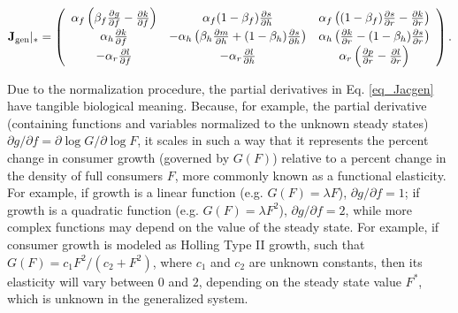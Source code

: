 \documentclass[12pt,english]{article}
\begin{document}
\begin{spacing}{1.9}
\begin{equation}
\mathbf{J}_{\rm gen}|_* =
\left(
\begin{array}{ccc}
 \alpha_f \left(\beta_f \frac{\partial g}{\partial f} - \frac{\partial k}{\partial f} \right) & \alpha_f(1-\beta_f)\frac{\partial s}{\partial h} & \alpha_f \left( (1-\beta_f)\frac{\partial s}{\partial r} - \frac{\partial k}{\partial r} \right) \\
 \alpha_h \frac{\partial k}{\partial f} & -\alpha_h \left(\beta_h \frac{\partial m}{\partial h} + (1-\beta_h) \frac{\partial s}{\partial h} \right) & \alpha_h \left(\frac{\partial k}{\partial r} - (1 - \beta_h)\frac{\partial s}{\partial r} \right) \\
 -\alpha_r \frac{\partial l}{\partial f} & -\alpha_r \frac{\partial l}{\partial h} & \alpha_r \left( \frac{\partial p}{\partial r} - \frac{\partial l}{\partial r} \right) \\
\end{array}
\right).
\label{eq_Jacgen}
\end{equation}

Due to the normalization procedure, the partial derivatives in Eq. \ref{eq_Jacgen} have tangible biological meaning.
Because, for example, the partial derivative (containing functions and variables normalized to the unknown steady states) $\partial g / \partial f = \partial \log G / \partial \log F$, it scales in such a way that it represents the percent change in consumer growth (governed by $G(F)$) relative to a percent change in the density of full consumers $F$, more commonly known as a functional elasticity.
For example, if growth is a linear function (e.g. $G(F) = \lambda F$), $\partial g / \partial f = 1$; if growth is a quadratic function (e.g. $G(F) = \lambda F^2$), $\partial g / \partial f = 2$, while more complex functions may depend on the value of the steady state.
For example, if consumer growth is modeled as Holling Type II growth, such that $G(F) = c_1 F^2/(c_2 + F^2)$, where $c_1$ and $c_2$ are unknown constants, then its elasticity will vary between $0$ and $2$, depending on the steady state value $F^*$, which is unknown in the generalized system.


\end{spacing}
\end{document}
